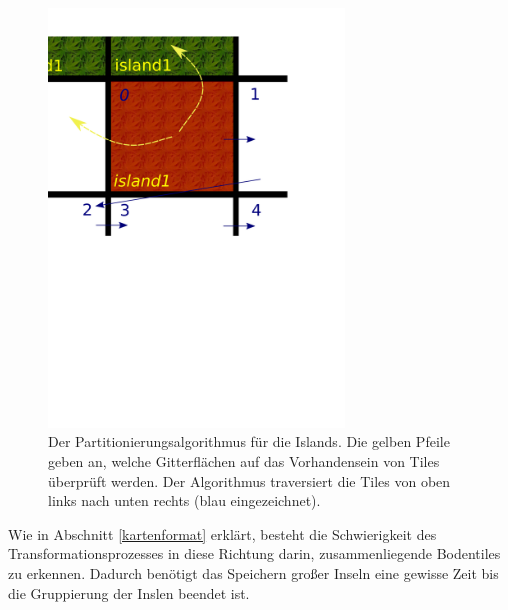 %
%
\begin{figure}[htbp]
  \centering
  
    \includegraphics[width=0.7\textwidth]{gfx/Zeichnung.png}
  
  \caption{Der Partitionierungsalgorithmus für die Islands. Die gelben Pfeile
  geben an, welche Gitterflächen auf das Vorhandensein von Tiles überprüft
  werden. Der Algorithmus traversiert die Tiles von oben links nach unten
  rechts (blau eingezeichnet).}
  \label{figure:automaton-intersection}
\end{figure}

Wie in Abschnitt \ref{kartenformat} erklärt, besteht die Schwierigkeit des
Transformationsprozesses in diese Richtung darin, zusammenliegende Bodentiles zu
erkennen. Dadurch benötigt das Speichern großer Inseln eine gewisse Zeit bis die
Gruppierung der Inslen beendet ist.
